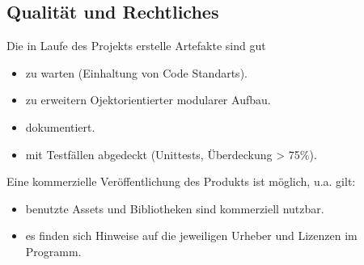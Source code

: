 \subsection{Qualität und Rechtliches}
\begin{requirements}
     Die in Laufe des Projekts erstelle Artefakte sind gut
    \begin{itemize}
        \item zu warten (Einhaltung von Code Standarts).
        \item zu erweitern Ojektorientierter modularer Aufbau.
        \item dokumentiert.
        \item mit Testfällen abgedeckt (Unittests, Überdeckung > 75\%).
    \end{itemize}
     Eine kommerzielle Veröffentlichung des Produkts ist möglich, u.a. gilt:
    \begin{itemize}
        \item benutzte Assets und Bibliotheken sind kommerziell nutzbar.
    	\item es finden sich Hinweise auf die jeweiligen Urheber und Lizenzen im Programm.
    \end{itemize}
\end{requirements}
